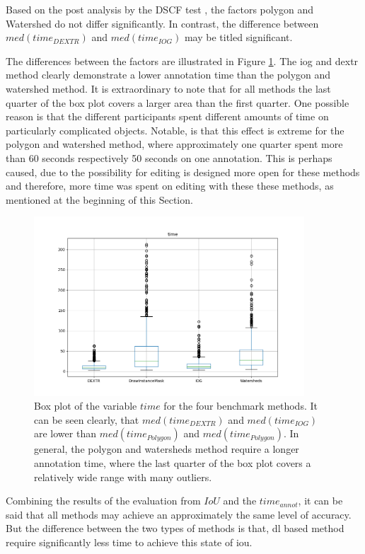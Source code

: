 Based on the post analysis by the DSCF test \cite{CF91-dscf}, the factors polygon and Watershed do not differ significantly.
In contrast, the difference between $ med \left( time_{DEXTR} \right) $ and $ med \left( time_{IOG} \right) $ may be titled significant.

The differences between the factors are illustrated in Figure \ref{fig:ch5:sec1:time_box_plot}.
The \gls{iog} and \gls{dextr} method clearly demonstrate a lower annotation time than the polygon and watershed method.
It is extraordinary to note that for all methods the last quarter of the box plot covers a larger area than the first quarter.
One possible reason is that the different participants spent different amounts of time on particularly complicated objects.
Notable, is that this effect is extreme for the polygon and watershed method, where approximately one quarter spent more than 60 seconds respectively 50 seconds on one annotation. 
This is perhaps caused, due to the possibility for editing is designed more open for these methods and therefore, more time was spent on editing with these these methods, as mentioned at the beginning of this Section.

\begin{figure}
	\centering
	\includegraphics[width=0.9\textwidth]{figures/chap51_time_boxplot.png}
	\caption[Box plot IoU per method]{
		Box plot of the variable $ time $ for the four benchmark methods.
		It can be seen clearly, that $ med \left( time_{DEXTR} \right) $ and $ med \left( time_{IOG} \right) $ are lower than $ med \left( time_{Polygon} \right) $ and $ med \left( time_{Polygon} \right) $.
		In general, the polygon and watersheds method require a longer annotation time, where the last quarter of the box plot covers a relatively wide range with many outliers. 
	} \label{fig:ch5:sec1:time_box_plot}
\end{figure}


Combining the results of the evaluation from $ IoU $ and the $ time_{annot} $, it can be said that all methods may achieve an approximately the same level of accuracy.
But the difference between the two types of methods is that, \gls{dl} based method require significantly less time to achieve this state of \gls{iou}.




